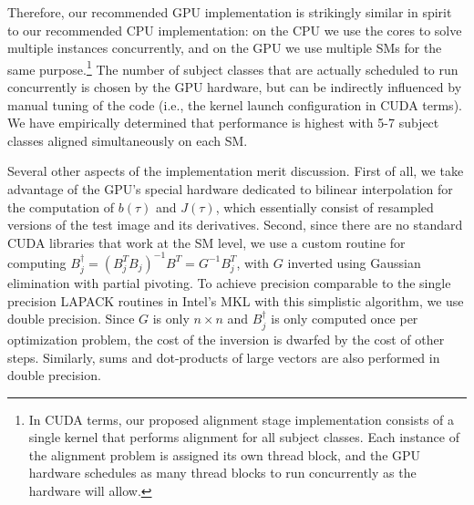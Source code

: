 \documentclass[preprint]{sigplanconf}
\begin{document}
Therefore, our recommended GPU implementation is strikingly similar in spirit
to our recommended CPU implementation: on the CPU we use the cores to solve
multiple instances concurrently, and on the GPU we use multiple SMs for the 
same purpose.\footnote{In CUDA terms, our proposed alignment stage
implementation consists of a single kernel that performs alignment for all
subject classes.  Each instance of the alignment problem is assigned its own
thread block, and the GPU hardware schedules as many thread blocks to run
concurrently as the hardware will allow.} The number of subject classes that
are actually scheduled to run concurrently is chosen by the GPU hardware, 
but can be indirectly influenced by manual tuning of the code (i.e., the kernel launch
configuration in CUDA terms). We have empirically determined
that performance is highest with 5-7 subject classes aligned simultaneously on each SM.

Several other aspects of the implementation merit discussion.  
First of all, we take advantage of the GPU's special hardware dedicated to bilinear interpolation
for the computation of $b(\tau)$ and $J(\tau)$, which essentially consist of resampled
versions of the test image and its derivatives.
Second, since there are no standard CUDA libraries that work at the SM level, we use a
custom routine for computing $B_j^\dagger = (B_j^TB_j)^{-1} B^T = G^{-1} B_j^T$, with $G$
inverted using Gaussian elimination with partial pivoting.  To achieve
precision comparable to the single precision LAPACK routines in Intel's MKL
with this simplistic algorithm, we use double precision.  Since $G$ is only $n
\times n$ and $B_j^\dagger$ is only computed once per optimization problem, the
cost of the inversion is dwarfed by the cost of other steps.  
Similarly, sums and dot-products of large vectors are also
performed in double precision.
\end{document}
